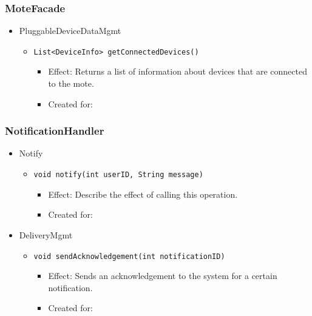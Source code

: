     \subsubsection{MoteFacade}
        \begin{itemize}
            \item PluggableDeviceDataMgmt
            \begin{itemize}
                \item \texttt{List<DeviceInfo> getConnectedDevices()}
                \begin{itemize}
                    \item Effect: Returns a list of information about devices that are connected to the mote.
                    \item Created for:
                \end{itemize}
            \end{itemize}
        \end{itemize}

    \subsubsection{NotificationHandler}
        \begin{itemize}
            \item Notify
            \begin{itemize}
                \item \texttt{void notify(int userID, String message)}
                \begin{itemize}
                    \item Effect: Describe the effect of calling this operation.
                    \item Created for:
                \end{itemize}
            \end{itemize}

            \item DeliveryMgmt
            \begin{itemize}
                \item \texttt{void sendAcknowledgement(int notificationID)}
                \begin{itemize}
                    \item Effect: Sends an acknowledgement to the system for a certain notification.
                    \item Created for:
                \end{itemize}
            \end{itemize}
        \end{itemize}

